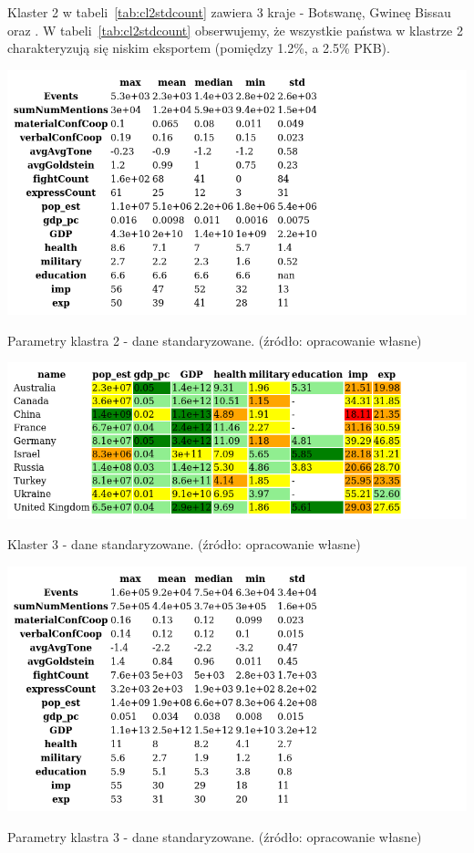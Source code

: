 \documentclass[11pt]{report}
\begin{document}
    Klaster 2 w tabeli~\ref{tab:cl2stdcount} zawiera 3 kraje - Botswanę, Gwineę Bissau oraz .
    W tabeli~\ref{tab:cl2stdcount} obserwujemy, że wszystkie państwa w klastrze 2 charakteryzują się niskim eksportem (pomiędzy 1.2\%, a 2.5\% PKB).

    \begin{table}[!htp]
        \centering
        \includegraphics[width=\linewidth]{tables/CLUST/desc/clust2std_desc.png}
        \caption{Parametry klastra 2 - dane standaryzowane. (źródło: opracowanie własne)}
        \label{tab:cl2std_desc}
    \end{table}

    \begin{table}[!htp]
        \centering
        \includegraphics[width=\linewidth]{tables/CLUST/cluster3stdkmeans.png}
        \caption{Klaster 3 - dane standaryzowane. (źródło: opracowanie własne)}
        \label{tab:cl3std}
    \end{table}

    \begin{table}[!htp]
        \centering
        \includegraphics[width=\linewidth]{tables/CLUST/desc/clust3std_desc.png}
        \caption{Parametry klastra 3 - dane standaryzowane. (źródło: opracowanie własne)}
        \label{tab:cl3std_desc}
    \end{table}
\end{document}
